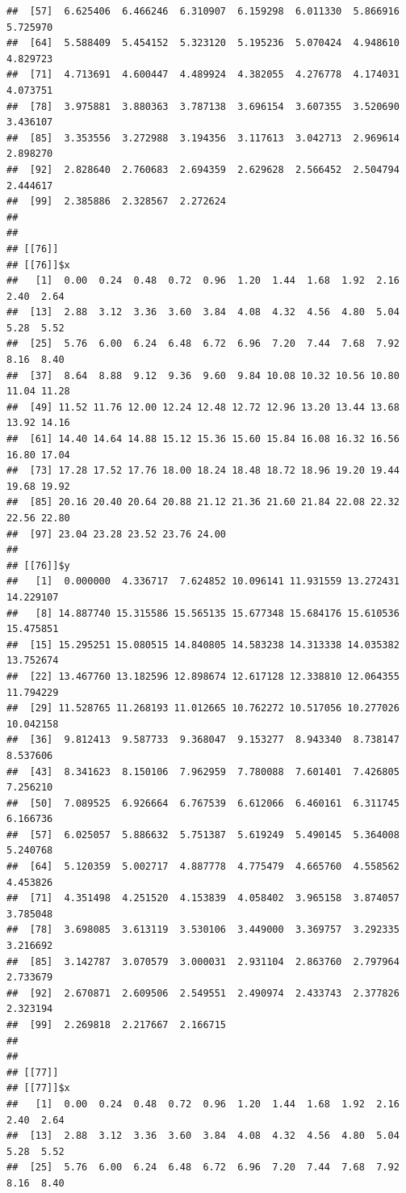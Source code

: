 \documentclass[
  ignorenonframetext,
]{beamer}
\begin{document}
\begin{frame}[fragile]{}
\begin{verbatim}
##  [57]  6.625406  6.466246  6.310907  6.159298  6.011330  5.866916  5.725970
##  [64]  5.588409  5.454152  5.323120  5.195236  5.070424  4.948610  4.829723
##  [71]  4.713691  4.600447  4.489924  4.382055  4.276778  4.174031  4.073751
##  [78]  3.975881  3.880363  3.787138  3.696154  3.607355  3.520690  3.436107
##  [85]  3.353556  3.272988  3.194356  3.117613  3.042713  2.969614  2.898270
##  [92]  2.828640  2.760683  2.694359  2.629628  2.566452  2.504794  2.444617
##  [99]  2.385886  2.328567  2.272624
## 
## 
## [[76]]
## [[76]]$x
##   [1]  0.00  0.24  0.48  0.72  0.96  1.20  1.44  1.68  1.92  2.16  2.40  2.64
##  [13]  2.88  3.12  3.36  3.60  3.84  4.08  4.32  4.56  4.80  5.04  5.28  5.52
##  [25]  5.76  6.00  6.24  6.48  6.72  6.96  7.20  7.44  7.68  7.92  8.16  8.40
##  [37]  8.64  8.88  9.12  9.36  9.60  9.84 10.08 10.32 10.56 10.80 11.04 11.28
##  [49] 11.52 11.76 12.00 12.24 12.48 12.72 12.96 13.20 13.44 13.68 13.92 14.16
##  [61] 14.40 14.64 14.88 15.12 15.36 15.60 15.84 16.08 16.32 16.56 16.80 17.04
##  [73] 17.28 17.52 17.76 18.00 18.24 18.48 18.72 18.96 19.20 19.44 19.68 19.92
##  [85] 20.16 20.40 20.64 20.88 21.12 21.36 21.60 21.84 22.08 22.32 22.56 22.80
##  [97] 23.04 23.28 23.52 23.76 24.00
## 
## [[76]]$y
##   [1]  0.000000  4.336717  7.624852 10.096141 11.931559 13.272431 14.229107
##   [8] 14.887740 15.315586 15.565135 15.677348 15.684176 15.610536 15.475851
##  [15] 15.295251 15.080515 14.840805 14.583238 14.313338 14.035382 13.752674
##  [22] 13.467760 13.182596 12.898674 12.617128 12.338810 12.064355 11.794229
##  [29] 11.528765 11.268193 11.012665 10.762272 10.517056 10.277026 10.042158
##  [36]  9.812413  9.587733  9.368047  9.153277  8.943340  8.738147  8.537606
##  [43]  8.341623  8.150106  7.962959  7.780088  7.601401  7.426805  7.256210
##  [50]  7.089525  6.926664  6.767539  6.612066  6.460161  6.311745  6.166736
##  [57]  6.025057  5.886632  5.751387  5.619249  5.490145  5.364008  5.240768
##  [64]  5.120359  5.002717  4.887778  4.775479  4.665760  4.558562  4.453826
##  [71]  4.351498  4.251520  4.153839  4.058402  3.965158  3.874057  3.785048
##  [78]  3.698085  3.613119  3.530106  3.449000  3.369757  3.292335  3.216692
##  [85]  3.142787  3.070579  3.000031  2.931104  2.863760  2.797964  2.733679
##  [92]  2.670871  2.609506  2.549551  2.490974  2.433743  2.377826  2.323194
##  [99]  2.269818  2.217667  2.166715
## 
## 
## [[77]]
## [[77]]$x
##   [1]  0.00  0.24  0.48  0.72  0.96  1.20  1.44  1.68  1.92  2.16  2.40  2.64
##  [13]  2.88  3.12  3.36  3.60  3.84  4.08  4.32  4.56  4.80  5.04  5.28  5.52
##  [25]  5.76  6.00  6.24  6.48  6.72  6.96  7.20  7.44  7.68  7.92  8.16  8.40

\end{verbatim}
\end{frame}
\end{document}
